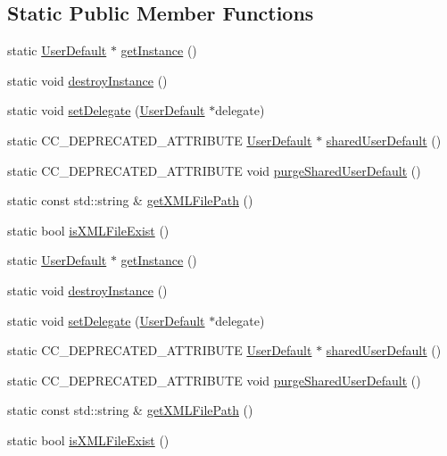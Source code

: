 \subsection*{Static Public Member Functions}
\begin{DoxyCompactItemize}
\item 
static \hyperlink{classUserDefault}{User\+Default} $\ast$ \hyperlink{classUserDefault_a0885d10cb5187584d49d245594a43b8c}{get\+Instance} ()
\item 
static void \hyperlink{classUserDefault_abaf8b97d4b852484a503eb41e6bfb1ae}{destroy\+Instance} ()
\item 
static void \hyperlink{classUserDefault_ae93fe9a602d0166fb70cbcc6d2ffbafd}{set\+Delegate} (\hyperlink{classUserDefault}{User\+Default} $\ast$delegate)
\item 
static C\+C\+\_\+\+D\+E\+P\+R\+E\+C\+A\+T\+E\+D\+\_\+\+A\+T\+T\+R\+I\+B\+U\+TE \hyperlink{classUserDefault}{User\+Default} $\ast$ \hyperlink{classUserDefault_ad47d1595d50f32eb7805fd36dd844b38}{shared\+User\+Default} ()
\item 
static C\+C\+\_\+\+D\+E\+P\+R\+E\+C\+A\+T\+E\+D\+\_\+\+A\+T\+T\+R\+I\+B\+U\+TE void \hyperlink{classUserDefault_adef2a718311ba39ea072abd617e3750c}{purge\+Shared\+User\+Default} ()
\item 
static const std\+::string \& \hyperlink{classUserDefault_a17183b8c17bb55fad96e4a19429d0281}{get\+X\+M\+L\+File\+Path} ()
\item 
static bool \hyperlink{classUserDefault_a87a36ab9acaabfa2ad0adcf82123e79f}{is\+X\+M\+L\+File\+Exist} ()
\item 
static \hyperlink{classUserDefault}{User\+Default} $\ast$ \hyperlink{classUserDefault_a4bf4cf202def99246208d080a3918875}{get\+Instance} ()
\item 
static void \hyperlink{classUserDefault_a3d11a0b35e577d5bf50ba19bc5343bf7}{destroy\+Instance} ()
\item 
static void \hyperlink{classUserDefault_acec4ac956094abe97f52755eccf26e2e}{set\+Delegate} (\hyperlink{classUserDefault}{User\+Default} $\ast$delegate)
\item 
static C\+C\+\_\+\+D\+E\+P\+R\+E\+C\+A\+T\+E\+D\+\_\+\+A\+T\+T\+R\+I\+B\+U\+TE \hyperlink{classUserDefault}{User\+Default} $\ast$ \hyperlink{classUserDefault_aaf51e16825fadb43004c92aba61a55e1}{shared\+User\+Default} ()
\item 
static C\+C\+\_\+\+D\+E\+P\+R\+E\+C\+A\+T\+E\+D\+\_\+\+A\+T\+T\+R\+I\+B\+U\+TE void \hyperlink{classUserDefault_ab697d605b11fa56d21ae2238cd79112c}{purge\+Shared\+User\+Default} ()
\item 
static const std\+::string \& \hyperlink{classUserDefault_aa10452da394dc5e043583781244eb70b}{get\+X\+M\+L\+File\+Path} ()
\item 
static bool \hyperlink{classUserDefault_a0fc15725eba5dc66a2792e3b2bfacb6b}{is\+X\+M\+L\+File\+Exist} ()
\end{DoxyCompactItemize}


